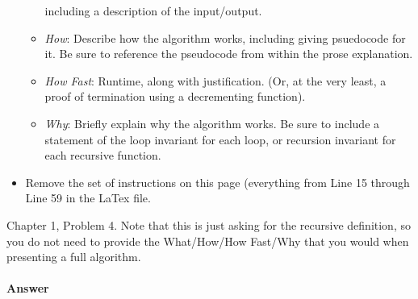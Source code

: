 \documentclass{article}
\begin{document}
\begin{itemize}
\begin{itemize}
                including a description of the input/output.
            \item \emph{How}: Describe how the algorithm works, including giving
                psuedocode for it.  Be sure to reference the pseudocode
                from within the prose explanation.
            \item \emph{How Fast}: Runtime, along with justification.  (Or, at
                the very least, a proof of termination using a decrementing function).
            \item \emph{Why}: Briefly explain why the algorithm works.  Be sure
                to include a statement of the loop invariant for each loop, or
                recursion invariant for each recursive function.
        \end{itemize}
    \item Remove the set of instructions on this page (everything from Line 15
        through Line 59 in the LaTex file.
\end{itemize}

\collab{\todo{}}

Chapter 1, Problem 4.  Note that this is just asking for the recursive
definition, so you do not need to provide the What/How/How Fast/Why that you
would when presenting a full algorithm.

\paragraph{Answer}
\todo{}
\end{document}
